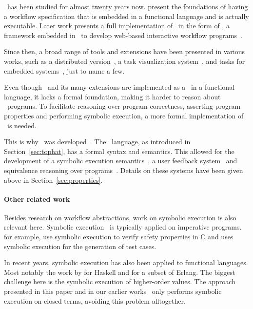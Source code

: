 \TOP\ has been studied for almost twenty years now.
\citet{conf/icfp/PlasmeijerAK07} present the foundations of having a workflow specification that is embedded in a functional language and is actually executable.
Later work presents a full implementation of \TOP\ in the form of \ITASKS, a framework embedded in \CLEAN\ to develop web-based interactive workflow programs~\cite{conf/ppdp/PlasmeijerLMAK12}.

Since then, a broad range of tools and extensions have been presented in various works, such as a distributed version~\cite{conf/ifl/OortgieseGAP17}, a task visualization system~\cite{conf/sfp/StutterheimPA14,conf/cefp/StutterheimAP15}, and tasks for embedded systems~\cite{conf/cgo/KoopmanLP18,conf/ifl/LubbersKP18,conf/mipro/LubbersKP19,conf/ifl/LubbersKP19}, just to name a few.

Even though \ITASKS\ and its many extensions are implemented as a \DSL\ in a functional language, it lacks a formal foundation, making it harder to reason about \TOP\ programs.
To facilitate reasoning over program correctness, asserting program properties and performing symbolic execution, a more formal implementation of \TOP\ is needed.

This is why \TOPHAT\ was developed~\cite{conf/ppdp/SteenvoordenNK19}.
The \TOPHAT\ language, as introduced in Section~\ref{sec:tophat}, has a formal syntax and semantics.
This allowed for the development of a symbolic execution semantics~\cite{conf/ifl/NausSK19}, a user feedback system~\cite{conf/sfp/NausS20} and equivalence reasoning over programs~\cite{conf/sfp/KlijnsmaS22}.
Details on these systems have been given above in Section~\ref{sec:properties}.

\paragraph{Other related work}

Besides research on workflow abstractions, work on symbolic execution is also relevant here.
Symbolic execution~\cite{Boyer1975, DBLP:conf/relsoft/King75} is typically applied on imperative programs.
\citet*{JaffarMNS2012} for example, use symbolic execution to verify safety properties in C and
\citet*{CadarDE2008} uses symbolic execution for the generation of test cases.

In recent years, symbolic execution has also been applied to functional languages.
Most notably the work by \citet*{HallahanXP2017,conf/pldi/HallahanXBJP19} for Haskell and \citet*{GiantsiosPS2017} for a subset of Erlang.
The biggest challenge here is the symbolic execution of higher-order values.
The approach presented in this paper and in our earlier works~\cite{conf/sfp/NausS20} only performs symbolic execution on closed terms, avoiding this problem alltogether.
